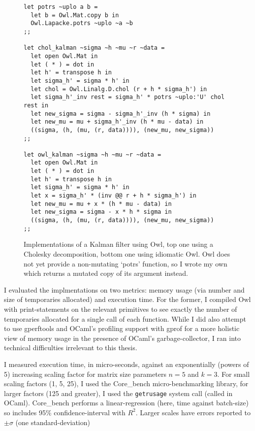 \begin{figure}[tp]
    \begin{verbatim}
let potrs ~uplo a b =
  let b = Owl.Mat.copy b in
  Owl.Lapacke.potrs ~uplo ~a ~b
;;

let chol_kalman ~sigma ~h ~mu ~r ~data =
  let open Owl.Mat in
  let ( * ) = dot in
  let h' = transpose h in
  let sigma_h' = sigma * h' in
  let chol = Owl.Linalg.D.chol (r + h * sigma_h') in
  let sigma_h'_inv rest = sigma_h' * potrs ~uplo:'U' chol rest in
  let new_sigma = sigma - sigma_h'_inv (h * sigma) in
  let new_mu = mu + sigma_h'_inv (h * mu - data) in
  ((sigma, (h, (mu, (r, data)))), (new_mu, new_sigma))
;;

let owl_kalman ~sigma ~h ~mu ~r ~data =
  let open Owl.Mat in
  let ( * ) = dot in
  let h' = transpose h in
  let sigma_h' = sigma * h' in
  let x = sigma_h' * (inv @@ r + h * sigma_h') in
  let new_mu = mu + x * (h * mu - data) in
  let new_sigma = sigma - x * h * sigma in
  ((sigma, (h, (mu, (r, data)))), (new_mu, new_sigma))
;;
    \end{verbatim}
    \caption{Implementations of a Kalman filter using Owl, top one using a
        Cholesky decomposition, bottom one using idiomatic Owl. Owl does not
        yet provide a non-mutating `potrs' function, so I wrote my own which
        returns a mutated copy of its argument instead.}\label{fig:chol_owl_kalman}

\end{figure}

I evaluated the implmentations on two metrics: memory usage (via number and
size of temporaries allocated) and execution time. For the former, I compiled
Owl with print-statements on the relevant primitives to see exactly the number
of temporaries allocated for a single call of each function. While I did also
attempt to use gperftools and OCaml's profiling support with gprof for a more
holistic view of memory usage in the presence of OCaml's garbage-collector, I
ran into technical difficulties irrelevant to this thesis.

I measured execution time, in micro-seconds, against an exponentially (powers
of 5) increasing scaling factor for matrix size parameters $n=5$ and $k=3$.
For small scaling factors (1, 5, 25), I used the Core\_bench micro-benchmarking
library, for larger factors (125 and greater), I used the \texttt{getrusage}
system call (called  in OCaml).  Core\_bench performs a
linear-regression (here, time against batch-size) so includes 95\%
confidence-interval with $R^2$. Larger scales have errors reported to $\pm
\sigma$ (one standard-deviation) 

